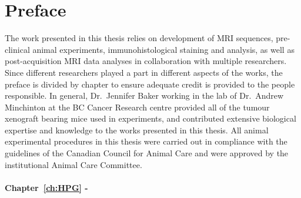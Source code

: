 
\chapter{Preface}
\label{ch:preface}

The work presented in this thesis relies on development of MRI sequences, pre-clinical animal experiments, immunohistological staining and analysis, as well as post-acquisition MRI data analyses in collaboration with multiple researchers.
Since different researchers played a part in different aspects of the works, the preface is divided by chapter to ensure adequate credit is provided to the people responsible.
In general, Dr.\ Jennifer Baker working in the lab of Dr.\ Andrew Minchinton at the BC Cancer Research centre provided all of the tumour xenograft bearing mice used in experiments, and contributed extensive biological expertise and knowledge to the works presented in this thesis.
All animal experimental procedures in this thesis were carried out in compliance with the guidelines of the Canadian Council for Animal Care and were approved by the institutional Animal Care Committee.

%

\subsubsection{Chapter~\ref{ch:HPG} - }

